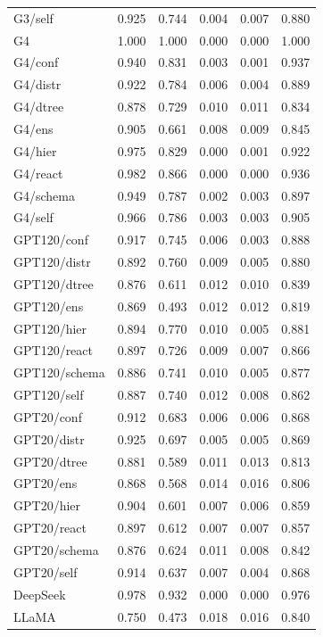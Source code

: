 \begin{table}[t]
\begin{tabular}{lrrrrr}
G3/self & 0.925 & 0.744 & 0.004 & 0.007 & 0.880 \\
G4 & 1.000 & 1.000 & 0.000 & 0.000 & 1.000 \\
G4/conf & 0.940 & 0.831 & 0.003 & 0.001 & 0.937 \\
G4/distr & 0.922 & 0.784 & 0.006 & 0.004 & 0.889 \\
G4/dtree & 0.878 & 0.729 & 0.010 & 0.011 & 0.834 \\
G4/ens & 0.905 & 0.661 & 0.008 & 0.009 & 0.845 \\
G4/hier & 0.975 & 0.829 & 0.000 & 0.001 & 0.922 \\
G4/react & 0.982 & 0.866 & 0.000 & 0.000 & 0.936 \\
G4/schema & 0.949 & 0.787 & 0.002 & 0.003 & 0.897 \\
G4/self & 0.966 & 0.786 & 0.003 & 0.003 & 0.905 \\
GPT120/conf & 0.917 & 0.745 & 0.006 & 0.003 & 0.888 \\
GPT120/distr & 0.892 & 0.760 & 0.009 & 0.005 & 0.880 \\
GPT120/dtree & 0.876 & 0.611 & 0.012 & 0.010 & 0.839 \\
GPT120/ens & 0.869 & 0.493 & 0.012 & 0.012 & 0.819 \\
GPT120/hier & 0.894 & 0.770 & 0.010 & 0.005 & 0.881 \\
GPT120/react & 0.897 & 0.726 & 0.009 & 0.007 & 0.866 \\
GPT120/schema & 0.886 & 0.741 & 0.010 & 0.005 & 0.877 \\
GPT120/self & 0.887 & 0.740 & 0.012 & 0.008 & 0.862 \\
GPT20/conf & 0.912 & 0.683 & 0.006 & 0.006 & 0.868 \\
GPT20/distr & 0.925 & 0.697 & 0.005 & 0.005 & 0.869 \\
GPT20/dtree & 0.881 & 0.589 & 0.011 & 0.013 & 0.813 \\
GPT20/ens & 0.868 & 0.568 & 0.014 & 0.016 & 0.806 \\
GPT20/hier & 0.904 & 0.601 & 0.007 & 0.006 & 0.859 \\
GPT20/react & 0.897 & 0.612 & 0.007 & 0.007 & 0.857 \\
GPT20/schema & 0.876 & 0.624 & 0.011 & 0.008 & 0.842 \\
GPT20/self & 0.914 & 0.637 & 0.007 & 0.004 & 0.868 \\
\midrule
DeepSeek & 0.978 & 0.932 & 0.000 & 0.000 & 0.976 \\
LLaMA & 0.750 & 0.473 & 0.018 & 0.016 & 0.840 \\

\end{tabular}
\end{table}
